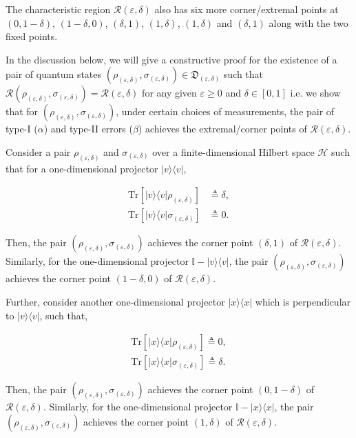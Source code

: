 \documentclass[onecolumn,ldraftcls, 11pt]{IEEEtran}
\newcommand{\tr}{\mathrm{Tr}}
\newcommand{\ketbra}[1]{|#1\rangle\langle#1|}
\newcommand{\eps}{\varepsilon}
\newcommand*{\bbI}{\mathbb{I}}
\newcommand*{\cR}{\mathcal{R}}
\newcommand*{\cH}{\mathcal{H}}
\begin{document}
The characteristic region $\cR(\eps,\delta)$ also has six more corner/extremal points at $(0,1-\delta)$, $(1-\delta,0)$, $(\delta,1)$, $(1,\delta)$, $(1,\delta)$ and $(\delta,1)$ along with the two fixed points. 
 


In the discussion below, we will give a constructive proof for the existence of a pair of quantum states $(\rho_{(\eps,\delta)},\sigma_{(\eps,\delta)}) \in \mathfrak{D}_{(\eps,\delta)}$ such that $\cR(\rho_{(\eps,\delta)},\sigma_{(\eps,\delta)}) = \cR(\eps,\delta)$ for any given $\eps \geq 0$ and $\delta \in [0,1]$ i.e. we show that for  $(\rho_{(\eps,\delta)},\sigma_{(\eps,\delta)})$, under certain choices of measurements, the pair of type-I ($\alpha$) and type-II errors ($\beta$) achieves the extremal/corner points of $\cR(\eps,\delta)$.

Consider a pair $\rho_{(\eps,\delta)}$ and $\sigma_{(\eps,\delta)}$ over a finite-dimensional Hilbert space $\cH$ such that for a one-dimensional projector $\ketbra{v}$, 

\begin{align}
    \tr[\ketbra{v}\rho_{(\eps,\delta)}] &\triangleq \delta, \label{vketrho}\\
    \tr[\ketbra{v}\sigma_{(\eps,\delta)}] &\triangleq 0.\label{vketsig}
\end{align}


Then, the pair $(\rho_{(\eps,\delta)},\sigma_{(\eps,\delta)})$ achieves the corner point $(\delta,1)$ of $\cR(\eps,\delta)$. 
Similarly, for the one-dimensional projector $\bbI - \ketbra{v}$, the pair $(\rho_{(\eps,\delta)},\sigma_{(\eps,\delta)})$ achieves the corner point $(1-\delta,0)$ of $\cR(\eps,\delta)$.

Further, consider another one-dimensional projector $\ketbra{x}$ which is perpendicular to $\ketbra{v}$, such that,

\begin{align}
    \tr[\ketbra{x}\rho_{(\eps,\delta)}] \triangleq 0, \label{xketrho}\\
    \tr[\ketbra{x}\sigma_{(\eps,\delta)}] \triangleq \delta.\label{xketsig}
\end{align}

Then, the pair $(\rho_{(\eps,\delta)},\sigma_{(\eps,\delta)})$ achieves the corner point $(0,1-\delta)$ of $\cR(\eps,\delta)$.
Similarly, for the one-dimensional projector $\bbI - \ketbra{x}$, the pair $(\rho_{(\eps,\delta)},\sigma_{(\eps,\delta)})$ achieves the corner point $(1,\delta)$ of $\cR(\eps,\delta)$. 
\end{document}

